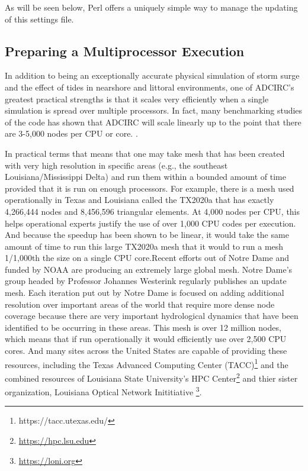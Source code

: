 \documentclass{article}
\begin{document}
As will be seen below, Perl offers a uniquely simple way to manage the updating
of this settings file.

\subsection{Preparing a Multiprocessor Execution}

In addition to being an exceptionally accurate physical simulation of storm
surge and the effect of tides in nearshore and littoral environments, one of
ADCIRC's greatest practical strengths is that it scales very efficiently when a
single simulation is spread over multiple processors. In fact, many benchmarking
studies of the code has shown that ADCIRC will scale linearly up to the point
that there are 3-5,000 nodes per CPU or core. \cite{benchmarks}.

In practical terms that means that one may take mesh that has been created with
very high resolution in specific areas (e.g., the southeast
Louisiana/Mississippi Delta) and run them within a bounded amount of time
provided that it is run on enough processors. For example, there is a mesh used
operationally in Texas and Louisiana called the TX2020a that has exactly
4,266,444 nodes and 8,456,596 triangular elements. At 4,000 nodes per CPU, this
helps operational experts justify the use of over 1,000 CPU codes per execution.
And because the speedup has been shown to be linear, it would take the same
amount of time to run this large TX2020a mesh that it would to run a mesh
1/1,000th the size on a single CPU core.Recent efforts out of Notre Dame and
funded by NOAA are producing an extremely large global mesh\cite{}. Notre Dame's
group headed by Professor Johannes Westerink regularly publishes an update mesh.
Each iteration put out by Notre Dame is focused on adding additional resolution
over important areas of the world that require more dense node coverage because
there are very important hydrological dynamics that have been identified to be
occurring in these areas. This mesh is over 12 million nodes, which means that
if run operationally it would efficiently use over 2,500 CPU cores. And many
sites across the United States are capable of providing these resources,
including the Texas Advanced Computing Center
(TACC)\footnote{{https://tacc.utexas.edu/}} and the combined resources of
Louisiana State University's HPC Center\footnote{\url{https://hpc.lsu.edu}} and
thier sister organization, Louisiana Optical Network Inititiative
\footnote{\url{https://loni.org}}.
\end{document}
